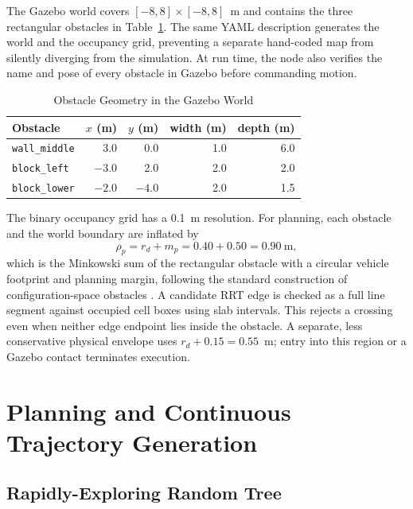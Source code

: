 \documentclass[conference]{IEEEtran}
\begin{document}
The Gazebo world covers $[-8,8]\times[-8,8]$~m and contains the three rectangular
obstacles in Table~\ref{tab:obstacles}. The same YAML description generates the
world and the occupancy grid, preventing a separate hand-coded map from
silently diverging from the simulation. At run time, the node also verifies the
name and pose of every obstacle in Gazebo before commanding motion.

\begin{table}[t]
\caption{Obstacle Geometry in the Gazebo World}
\label{tab:obstacles}
\centering
\begin{tabular}{lrrrr}
\hline
Obstacle & $x$ (m) & $y$ (m) & width (m) & depth (m)\\
\hline
\texttt{wall\_middle} & 3.0 & 0.0 & 1.0 & 6.0\\
\texttt{block\_left}  & $-3.0$ & 2.0 & 2.0 & 2.0\\
\texttt{block\_lower} & $-2.0$ & $-4.0$ & 2.0 & 1.5\\
\hline
\end{tabular}
\end{table}

The binary occupancy grid has a 0.1~m resolution. For planning, each obstacle
and the world boundary are inflated by
\begin{equation}
  \rho_p=r_d+m_p=0.40+0.50=0.90~\text{m},
  \label{eq:inflation}
\end{equation}
which is the Minkowski sum of the rectangular obstacle with a circular vehicle
footprint and planning margin, following the standard construction of
configuration-space obstacles \cite[Ch.~4]{lavalle2006}. A candidate RRT edge is checked as a full line
segment against occupied cell boxes using slab intervals. This rejects a
crossing even when neither edge endpoint lies inside the obstacle. A separate,
less conservative physical envelope uses $r_d+0.15=0.55$~m; entry into this
region or a Gazebo contact terminates execution.

\section{Planning and Continuous Trajectory Generation}

\subsection{Rapidly-Exploring Random Tree}
\end{document}
